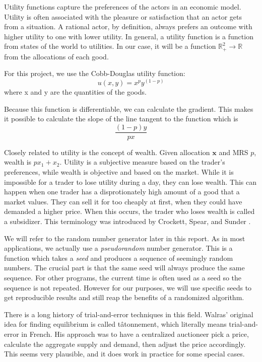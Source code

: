 \documentclass[12pt,a4paper,titlepage]{article}
\begin{document}
Utility functions capture the preferences of the actors in an economic model.
Utility is often associated with the pleasure or satisfaction that an actor gets from a situation.
A rational actor, by definition, always prefers an outcome with higher utility to one with lower utility. 
In general, a utility function is a function from states of the world to utilities.
In our case, it will be a function $\mathbb{R}^2_+ \rightarrow \mathbb{R}$ from the allocations of each good.

For this project, we use the Cobb-Douglas utility function:
\[
  u(x, y) = x^p y^{(1-p)}
\]
where x and y are the quantities of the goods.

Because this function is differentiable, we can calculate the gradient.
This makes it possible to calculate the slope of the line tangent to the function which is 
\[
  \frac{(1-p)y}{px}
\]

Closely related to utility is the concept of wealth.
Given allocation $\mathbf{x}$ and MRS $p$, wealth is $ px_1 + x_2 $.
Utility is a subjective measure based on the trader's preferences, while wealth is objective and based on the market.
While it is impossible for a trader to lose utility during a day, they can lose wealth.
This can happen when one trader has a disprotionately high amount of a good that a market values.
They can sell it for too cheaply at first, when they could have demanded a higher price.
When this occurs, the trader who loses wealth is called a subsidizer.
This terminology was introduced by Crockett, Spear, and Sunder \cite{crockett}.

We will refer to the random number generator later in this report.
As in most applications, we actually use a \textit{pseudorandom} number generator.
This is a function which takes a \textit{seed} and produces a sequence of seemingly random numbers.
The crucial part is that the same seed will always produce the same sequence.
For other programs, the current time is often used as a seed so the sequence is not repeated.
However for our purposes, we will use specific seeds to get reproducible results and still reap the benefits of a randomized algorithm.

There is a long history of trial-and-error techniques in this field.
Walras' original idea for finding equilibrium is called tâtonnement, which literally means trial-and-error in French.
His approach was to have a centralized auctioneer pick a price, calculate the aggregate supply and demand, then adjust the price accordingly.
This seems very plausible, and it does work in practice for some special cases.
\end{document}
